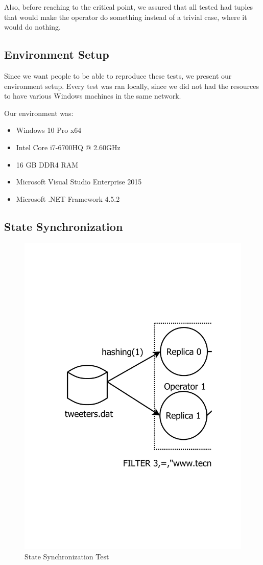 \documentclass[times, 10pt,twocolumn]{article}
\begin{document}
Also, before reaching to the critical point, we assured that all tested had tuples that would make the operator do something instead of a trivial case, where it would do nothing.

\subsection{Environment Setup}
Since we want people to be able to reproduce these tests, we present our environment setup. Every test
was ran locally, since we did not had the resources to have various Windows machines in the same network.

Our environment was:
\begin{itemize}
	\item Windows 10 Pro x64
	\item Intel Core i7-6700HQ @ 2.60GHz
	\item 16 GB DDR4 RAM
	\item Microsoft Visual Studio Enterprise 2015
	\item Microsoft .NET Framework 4.5.2
\end{itemize}
\subsection{State Synchronization}
\begin{figure}[h]
	\centering
	\includegraphics[scale=0.32]{"Tests/first"}
	\caption{State Synchronization Test} 
	\label{fig:state}
\end{figure}
	
\end{document}
